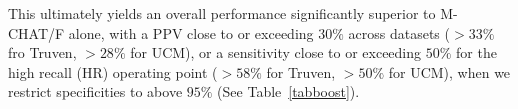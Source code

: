 \documentclass[onecolumn, compsoc,11pt]{IEEEtran}
\begin{document}
%
This ultimately yields an overall performance significantly  superior to  M-CHAT/F alone, with  a PPV close to or exceeding $30\%$  across datasets ($>33\%$ fro Truven, $>28\%$ for UCM), or a sensitivity close to or exceeding $50\%$ for the high recall (HR) operating point ($>58\%$ for  Truven, $>50\%$ for UCM), when we restrict specificities to above $95\%$ (See Table~\ref{tabboost}). 
\end{document}
